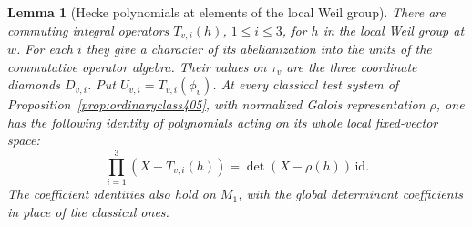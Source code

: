 \documentclass[a4paper,11pt]{article}
\newtheorem{lemma}[proposition]{Lemma}
\theoremstyle{definition}
\theoremstyle{remark}
\numberwithin{equation}{section}
\begin{document}
\begin{lemma}[Hecke polynomials at elements of the local Weil group]\leavevmode
\label{lem:weiltorus406}
There are commuting integral operators \(T_{v,i}(h)\),
\(1\le i\le3\), for \(h\) in the local Weil group at \(w\).
For each \(i\) they give a character of its abelianization
into the units of the commutative operator algebra. Their
values on \(\tau_v\) are the three coordinate diamonds
\(D_{v,i}\). Put \(U_{v,i}=T_{v,i}(\phi_v)\). At every
classical test system of Proposition~\ref{prop:ordinaryclass405},
with normalized Galois representation \(\rho\), one has
the following identity of polynomials acting on its whole
local fixed-vector space:
\[
                 \prod_{i=1}^3(X-T_{v,i}(h))
                     =\det(X-\rho(h))\,\mathrm{id}.
\]
The coefficient identities also hold on \(M_1\), with the
global determinant coefficients in place of the classical
ones.
\end{lemma}
\end{document}
